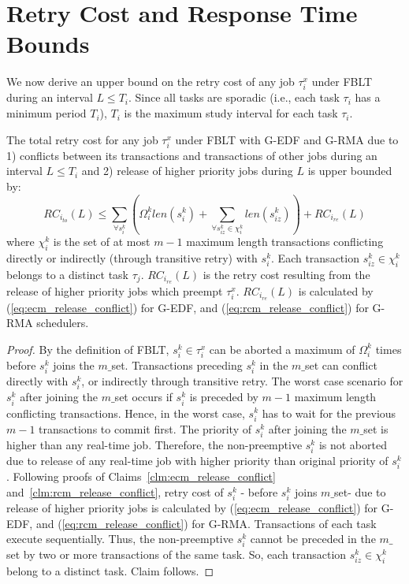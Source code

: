 \section{Retry Cost and Response Time Bounds}\label{fblt rc}
%
We now derive an upper bound on the retry cost of any job $\tau_{i}^{x}$
under FBLT during an interval $L\le T_{i}$. Since all tasks are sporadic
(i.e., each task $\tau_{i}$ has a minimum period $T_{i}$), $T_{i}$
is the maximum study interval for each task $\tau_{i}$. 
%
\begin{clm}\label{clm:total_rc_fblt}
The total retry cost for any job $\tau_{i}^{x}$ under FBLT with G-EDF and G-RMA due to 1) conflicts between its transactions and transactions of other jobs during an interval $L\le T_{i}$ and 2) release of higher priority jobs during $L$ is upper bounded by:
%
\begin{equation}
RC_{i_{to}}(L)\le\sum_{\forall s_{i}^{k}}\left(\Omega_{i}^{k}len(s_{i}^{k})+\sum_{\forall s_{iz}^k\in \chi_i^k} len(s_{iz}^{k})\right)+RC_{i_{re}}(L)
\label{eq:fblt_rc}
\end{equation} 
where $\chi_i^k$ is the set of at most $m-1$ maximum length transactions conflicting directly or indirectly (through transitive retry) with $s_i^k$. Each transaction $s_{iz}^k \in \chi_i^k$ belongs to a distinct task $\tau_j$. $RC_{i_{re}}(L)$ is the retry cost resulting
from the release of higher priority jobs which preempt $\tau_{i}^{x}$.
$RC_{i_{re}}(L)$ is calculated by (\ref{eq:ecm_release_conflict}) for G-EDF, and (\ref{eq:rcm_release_conflict}) for G-RMA schedulers.
%
\end{clm}
%
\begin{proof}
By the definition of FBLT, $s_{i}^{k}\in\tau_{i}^{x}$ can be aborted
a maximum of $\Omega_{i}^{k}$ times before $s_{i}^{k}$ joins the $m\_$set. Transactions preceding  $s_i^k$ in the $m\_$set can conflict directly with $s_i^k$, or indirectly through transitive retry. The worst case scenario for $s_{i}^{k}$ after joining the $m\_$set occurs if $s_{i}^{k}$ is preceded by $m-1$ maximum length conflicting transactions. Hence, in the worst case, $s_{i}^{k}$ has to wait for the previous $m-1$ transactions to commit first. The priority of $s_{i}^{k}$ after joining the $m\_$set is higher than any real-time job. Therefore, the non-preemptive $s_{i}^{k}$ is not aborted due to release of any real-time job with higher priority than original priority of $s_i^k$. Following proofs of Claims~\ref{clm:ecm_release_conflict} and~\ref{clm:rcm_release_conflict}, retry cost of $s_i^k$ - before $s_i^k$ joins $m\_$set- due to release of higher priority jobs is calculated by (\ref{eq:ecm_release_conflict}) for G-EDF, and (\ref{eq:rcm_release_conflict}) for G-RMA. Transactions of each task execute sequentially. Thus, the non-preemptive $s_i^k$ cannot be preceded in the $m\_$set by two or more transactions of the same task. So, each transaction $s_{iz}^k \in \chi_i^k$ belong to a distinct task. Claim follows.
%
\end{proof}
